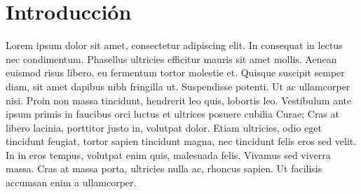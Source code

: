 \section{Introducción}
Lorem ipsum dolor sit amet, consectetur adipiscing elit. In consequat in lectus nec condimentum. Phasellus ultricies efficitur mauris sit amet mollis. Aenean euismod risus libero, eu fermentum tortor molestie et. Quisque suscipit semper diam, sit amet dapibus nibh fringilla ut. Suspendisse potenti. Ut ac ullamcorper nisi. Proin non massa tincidunt, hendrerit leo quis, lobortis leo. Vestibulum ante ipsum primis in faucibus orci luctus et ultrices posuere cubilia Curae; Cras at libero lacinia, porttitor justo in, volutpat dolor. Etiam ultricies, odio eget tincidunt feugiat, tortor sapien tincidunt magna, nec tincidunt felis eros sed velit. In in eros tempus, volutpat enim quis, malesuada felis. Vivamus sed viverra massa. Cras at massa porta, ultricies nulla ac, rhoncus sapien. Ut facilisis accumsan enim a ullamcorper.